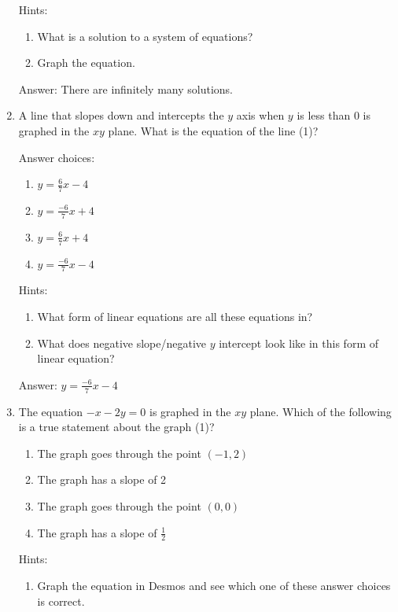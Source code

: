 \documentclass{article}
\begin{document}
\begin{enumerate}
{	      Hints:
	      \begin{enumerate}
		      \item{What is a solution to a system of equations?}
		      \item {Graph the equation.}
	      \end{enumerate}

	      Answer: There are infinitely many solutions.
	      }

	\item {A line that slopes down and intercepts the $y$ axis when $y$ is less than $0$ is graphed in the $xy$ plane. What is the equation of the line (1)?

	      Answer choices:
	      \begin{enumerate}
		      \item{\(y=\frac{6}{7}x-4\)}
		      \item{\(y=\frac{-6}{7}x+4\)}
		      \item{\(y=\frac{6}{7}x+4\)}
		      \item{\(y=\frac{-6}{7}x-4\)}
	      \end{enumerate}

	      Hints:
	      \begin{enumerate}
		      \item{What form of linear equations are all these equations in?}
		      \item {What does negative slope/negative $y$ intercept look like in this form of linear equation?}
	      \end{enumerate}

	      Answer: \(y=\frac{-6}{7}x-4\)}
	\item {The equation \(-x-2y=0\) is graphed in the $xy$ plane. Which of the following is a true statement about the graph (1)?

	      \begin{enumerate}
		      \item {The graph goes through the point $(-1,2)$}
		      \item {The graph has a slope of 2}
		      \item {The graph goes through the point $(0,0)$}
		      \item {The graph has a slope of \(\frac{1}{2}\)}
	      \end{enumerate}

	      Hints:
	      \begin{enumerate}
		      \item{Graph the equation in Desmos and see which one of these answer choices is correct.}
	      \end{enumerate}

}
\end{enumerate}
\end{document}
